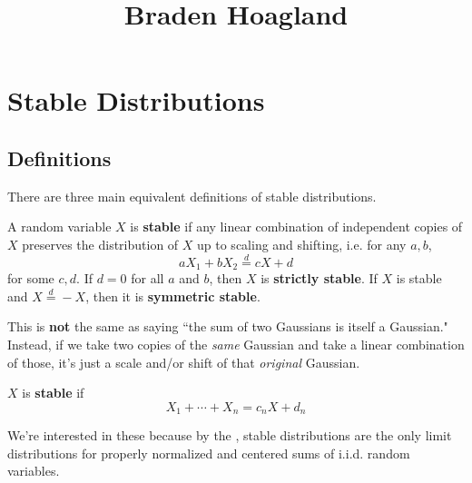 \documentclass[twoside,10pt]{report}
\begin{document}
\title{Braden Hoagland}{}
\tableofcontents



\chapter{Stable Distributions}

\section{Definitions}

There are three main equivalent definitions of stable distributions.

\begin{defn}[]
A random variable $X$ is \textbf{stable} if any linear combination of independent copies of $X$ preserves the distribution of $X$ up to scaling and shifting, i.e. for any $a,b$,
\[
a X_1 + b X_2 \stackrel{d}{=} c X + d
\] for some $c,d$. If $d=0$ for all $a$ and $b$, then $X$ is \textbf{strictly stable}. If $X$ is stable and $X \stackrel{d}{=} -X$, then it is \textbf{symmetric stable}.
\end{defn}

\begin{note}[]
This is \textbf{not} the same as saying ``the sum of two Gaussians is itself a Gaussian." Instead, if we take two copies of the \emph{same} Gaussian and take a linear combination of those, it's just a scale and/or shift of that \emph{original} Gaussian.
\end{note}

\begin{defn}[]
$X$ is \textbf{stable} if
\[
X_1 + \cdots + X_{n} = c_{n}X + d_{n}
\] 

\end{defn}

We're interested in these because by the , stable distributions are the only limit distributions for properly normalized and centered sums of i.i.d. random variables.


\end{document}
